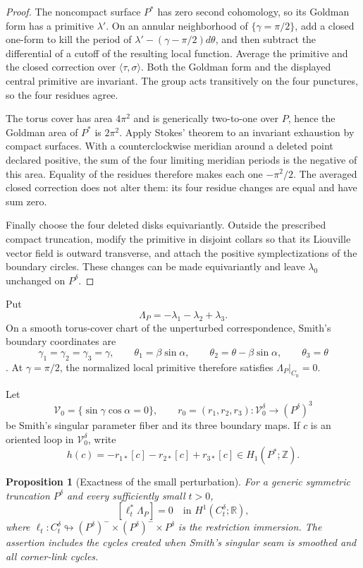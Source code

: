 \documentclass[11pt,reqno]{amsart}
\theoremstyle{plain}
\newtheorem{proposition}[theorem]{Proposition}
\theoremstyle{definition}
\newcommand{\R}{\mathbb{R}}
\newcommand{\Z}{\mathbb{Z}}
\newcommand{\iss}{\looparrowright}
\begin{document}
\begin{proof}
The noncompact surface $P^*$ has zero second cohomology, so its Goldman form has a primitive
$\lambda'$.  On an annular neighborhood of $\{\gamma=\pi/2\}$, add a closed one-form to kill the
period of $\lambda'-(\gamma-\pi/2)d\theta$, and then subtract the differential of a cutoff of the
resulting local function.  Average the primitive and the closed correction over
$\langle\tau,\sigma\rangle$.  Both the Goldman form and the displayed central primitive are
invariant.  The group acts transitively on the four punctures, so the four residues agree.

The torus cover has area $4\pi^2$ and is generically two-to-one over $P$, hence the Goldman area of
$P^*$ is $2\pi^2$.  Apply Stokes' theorem to an invariant exhaustion by compact surfaces.  With a
counterclockwise meridian around a deleted point declared positive, the sum of the four limiting
meridian periods is the negative of this area.  Equality of the residues therefore makes each one
$-\pi^2/2$.  The averaged closed correction does not alter them: its four residue changes are
equal and have sum zero.

Finally choose the four deleted disks equivariantly.  Outside the prescribed compact truncation,
modify the primitive in disjoint collars so that its Liouville vector field is outward transverse,
and attach the positive symplectizations of the boundary circles.  These changes can be made
equivariantly and leave $\lambda_0$ unchanged on $P^\delta$.
\end{proof}

Put
\[
 \Lambda_P=-\lambda_1-\lambda_2+\lambda_3.
\]
On a smooth torus-cover chart of the unperturbed correspondence, Smith's boundary coordinates are
\begin{equation}\label{eq:smith-boundary}
 \gamma_1=\gamma_2=\gamma_3=\gamma,
 \qquad
 \theta_1=\beta\sin\alpha,
 \qquad
 \theta_2=\theta-\beta\sin\alpha,
 \qquad
 \theta_3=\theta
\end{equation}
\cite[Eqs.~(3.1.4)--(3.1.5)]{Smith}.  At $\gamma=\pi/2$, the normalized local primitive therefore
satisfies $\Lambda_P|_{C_0}=0$.

Let
\[
 \mathcal V_0=\{\sin\gamma\cos\alpha=0\},
 \qquad
 r_0=(r_1,r_2,r_3):\mathcal V_0^\delta\longrightarrow(P^\delta)^3
\]
be Smith's singular parameter fiber and its three boundary maps.  If $c$ is an oriented loop in
$\mathcal V_0^\delta$, write
\[
 h(c)=-r_{1*}[c]-r_{2*}[c]+r_{3*}[c]\in H_1(P^*;\Z).
\]

\begin{proposition}[Exactness of the small perturbation]\label{prop:perturbed-exactness}
For a generic symmetric truncation $P^\delta$ and every sufficiently small $t>0$,
\[
 [\ell_t^*\Lambda_P]=0\quad\text{in }H^1(C_t^\delta;\R),
\]
where $\ell_t:C_t^\delta\iss(P^\delta)^-\times(P^\delta)^-\times P^\delta$ is the restriction
immersion.  The assertion includes the cycles created when Smith's singular seam is smoothed and
all corner-link cycles.
\end{proposition}
\end{document}

